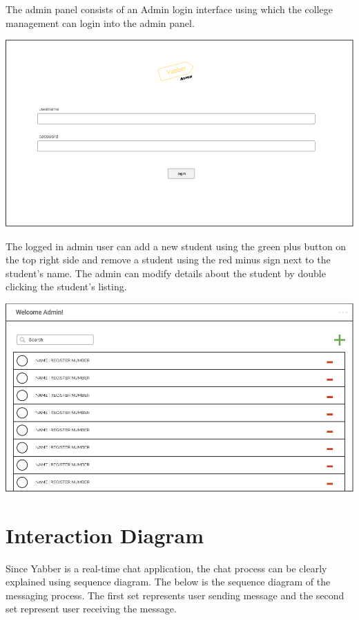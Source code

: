 \documentclass{scrreprt}
\begin{document}
The admin panel consists of an Admin login interface using which the college
management can login into the admin panel.

\begin{center}
\includegraphics[scale=.3]{adminlogin}
\end{center}

The logged in admin user can add a new student using the green plus button on
the top right side and remove a student using the red minus sign next to the
student's name. The admin can modify details about the student by double clicking
the student's listing.

\begin{center}
\includegraphics[scale=.3]{admin}
\end{center}

\section{Interaction Diagram}
Since Yabber is a real-time chat application, the chat process can be clearly
explained using sequence diagram. The below is the sequence diagram of the
messaging process. The first set represents user sending message and the second
set represent user receiving the message.
\end{document}
